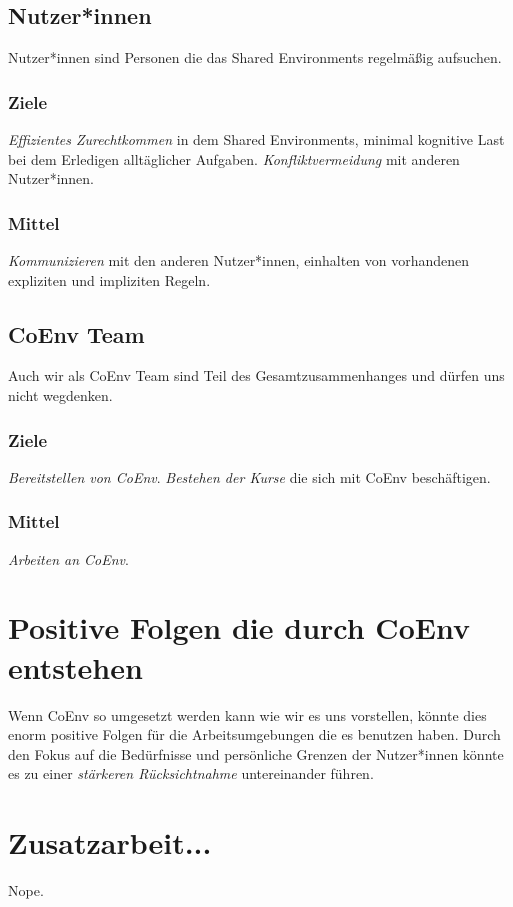 \documentclass{article}
\begin{document}
\subsection{Nutzer*innen}

Nutzer*innen sind Personen die das Shared Environments regelmäßig aufsuchen.

\subsubsection*{Ziele}
\emph{Effizientes Zurechtkommen} in dem Shared Environments, minimal kognitive Last bei dem Erledigen alltäglicher Aufgaben. \emph{Konfliktvermeidung} mit anderen Nutzer*innen.

\subsubsection*{Mittel}
\emph{Kommunizieren} mit den anderen Nutzer*innen, einhalten von vorhandenen expliziten und impliziten Regeln.

\subsection{CoEnv Team}
Auch wir als CoEnv Team sind Teil des Gesamtzusammenhanges und dürfen uns nicht wegdenken.

\subsubsection*{Ziele}
\emph{Bereitstellen von CoEnv}. \emph{Bestehen der Kurse} die sich mit CoEnv beschäftigen.

\subsubsection*{Mittel}
\emph{Arbeiten an CoEnv}.



\section{Positive Folgen die durch CoEnv entstehen}
Wenn CoEnv so umgesetzt werden kann wie wir es uns vorstellen, könnte dies enorm positive Folgen für die Arbeitsumgebungen die es benutzen haben. Durch den Fokus auf die Bedürfnisse und persönliche Grenzen der Nutzer*innen könnte es zu einer \emph{stärkeren Rücksichtnahme} untereinander führen.

\section{Zusatzarbeit...}

Nope.

\newpage



\end{document}
